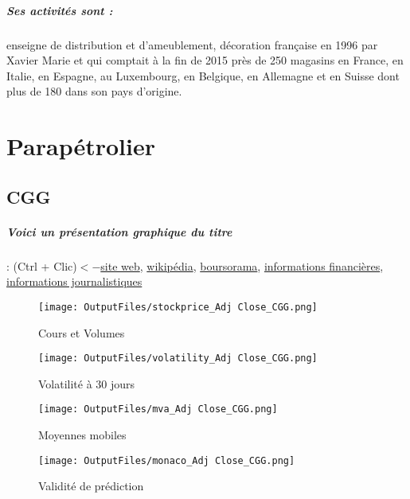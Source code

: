 \documentclass[11pt,a4paper]{report}%
\begin{document}
\paragraph{Ses activités sont : } enseigne de distribution et d'ameublement, décoration française en 1996 par Xavier Marie et qui comptait à la fin de 2015 près de 250 magasins en France, en Italie, en Espagne, au Luxembourg, en Belgique, en Allemagne et en Suisse dont plus de 180 dans son pays d'origine. 
    
    \newpage\chapter{Parapétrolier}


\section{CGG}

\paragraph{Voici un présentation graphique du titre} : (Ctrl + Clic)$<-$\href{https://www.cgg.com/fr/Investisseurs}{site web}, \href{https://fr.wikipedia.org/wiki/CGG_(entreprise)}{wikipédia}, \href{https://www.boursorama.com/cours/1rPCGG}{boursorama}, \href{https://www.qwant.com/?q=site:https:%2f%2fwww.easybourse.com%2faction-societe%2fCGG&t=web&client=ext-firefox-hp}{informations financières}, \href{https://bourse.lerevenu.com/cours-de-bourse/fiche-valeur-synthese/CGG/CGG-FR}{informations journalistiques}
\begin{figure}[!htb]
   \begin{minipage}{0.5\textwidth}
     \centering
     \texttt{[image: OutputFiles/stockprice\_Adj Close\_CGG.png]}
     \caption{Cours et Volumes}\label{Fig:price_CGG}
   \end{minipage}\hfill
   \begin{minipage}{0.5\textwidth}
     \centering
     \texttt{[image: OutputFiles/volatility\_Adj Close\_CGG.png]}
     \caption{Volatilité à 30 jours}\label{Fig:volat_CGG}
   \end{minipage}
\end{figure}
\begin{figure}[!htb]
   \begin{minipage}{0.5\textwidth}
     \centering
     \texttt{[image: OutputFiles/mva\_Adj Close\_CGG.png]}
     \caption{Moyennes mobiles}\label{Fig:mva_CGG}
   \end{minipage}\hfill
   \begin{minipage}{0.5\textwidth}
     \centering
     \texttt{[image: OutputFiles/monaco\_Adj Close\_CGG.png]}
     \caption{Validité de prédiction}\label{Fig:prediction_CGG}
   \end{minipage}
\end{figure}
\end{document}
